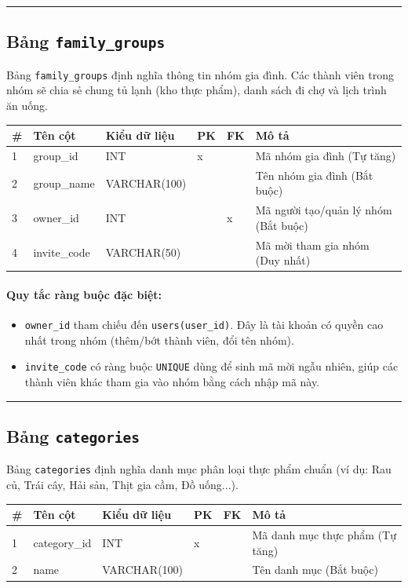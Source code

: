 \documentclass[12pt,a4paper]{article}
\begin{document}
\vskip 0.5cm
\noindent\rule{\textwidth}{0.5pt}
\vskip 0.5cm

\subsection{Bảng \texttt{family\_groups}}
Bảng \texttt{family\_groups} định nghĩa thông tin nhóm gia đình. Các thành viên trong nhóm sẽ chia sẻ chung tủ lạnh (kho thực phẩm), danh sách đi chợ và lịch trình ăn uống.

\begin{longtable}{|p{0.5cm}|p{3.4cm}|p{3.2cm}|p{0.7cm}|p{0.7cm}|p{3.6cm}|}
\hline
\textbf{\#} & \textbf{Tên cột} & \textbf{Kiểu dữ liệu} & \textbf{PK} & \textbf{FK} & \textbf{Mô tả} \\ \hline
\endhead
1 & group\_id & INT & x & & Mã nhóm gia đình (Tự tăng) \\ \hline
2 & group\_name & VARCHAR(100) & & & Tên nhóm gia đình (Bắt buộc) \\ \hline
3 & owner\_id & INT & & x & Mã người tạo/quản lý nhóm (Bắt buộc) \\ \hline
4 & invite\_code & VARCHAR(50) & & & Mã mời tham gia nhóm (Duy nhất) \\ \hline
\end{longtable}

\paragraph{Quy tắc ràng buộc đặc biệt:}
\begin{itemize}
    \item \texttt{owner\_id} tham chiếu đến \texttt{users(user\_id)}. Đây là tài khoản có quyền cao nhất trong nhóm (thêm/bớt thành viên, đổi tên nhóm).
    \item \texttt{invite\_code} có ràng buộc \texttt{UNIQUE} dùng để sinh mã mời ngẫu nhiên, giúp các thành viên khác tham gia vào nhóm bằng cách nhập mã này.
\end{itemize}

\vskip 0.5cm
\noindent\rule{\textwidth}{0.5pt}
\vskip 0.5cm

\subsection{Bảng \texttt{categories}}
Bảng \texttt{categories} định nghĩa danh mục phân loại thực phẩm chuẩn (ví dụ: Rau củ, Trái cây, Hải sản, Thịt gia cầm, Đồ uống...).

\begin{longtable}{|p{0.5cm}|p{3.4cm}|p{3.2cm}|p{0.7cm}|p{0.7cm}|p{3.6cm}|}
\hline
\textbf{\#} & \textbf{Tên cột} & \textbf{Kiểu dữ liệu} & \textbf{PK} & \textbf{FK} & \textbf{Mô tả} \\ \hline
\endhead
1 & category\_id & INT & x & & Mã danh mục thực phẩm (Tự tăng) \\ \hline
2 & name & VARCHAR(100) & & & Tên danh mục (Bắt buộc) \\ \hline
\end{longtable}
\end{document}
